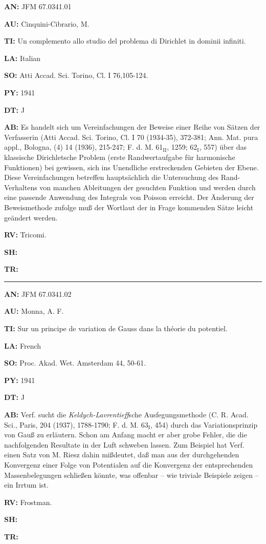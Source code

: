 \item{\bf AN:} JFM 67.0341.01
\item{\bf AU:} Cinquini-Cibrario, M.
\item{\bf TI:} Un complemento allo studio del problema di
Dirichlet in dominii infiniti.
\item{\bf LA:} Italian
\item{\bf SO:} Atti Accad. Sci. Torino, Cl. I 76,105-124.
\item{\bf PY:} 1941
\item{\bf DT:} J
\item{\bf AB:}{\parindent15pt
 Es handelt sich um Vereinfachungen der Beweise einer Reihe von S\"atzen der
Verfasserin (Atti Accad.
Sci. Torino, Cl. I 70 (1934-35), 372-381; Ann. Mat. pura
appl., Bologna, (4) 14
(1936), 215-247; F. d. M. 61$_{\text{II}}$, 1259; 62$_{\text{I}}$, 557) \"uber das klassische
Dirichletsche Problem (erste Randwertaufgabe f\"ur harmonische Funktionen) bei
gewissen, sich ins Unendliche erstreckenden Gebieten der Ebene. Diese
Vereinfachungen betreffen
haupts\"achlich die Untersuchung des Rand-Verhaltens von manchen
Ableitungen der gesuchten Funktion und werden durch eine passende Anwendung
des Integrals von Poisson erreicht. Der \"Anderung der Beweismethode zufolge
mu{\ss}
der Wortlaut der in Frage kommenden S\"atze leicht ge\"andert werden.
}
\item{\bf RV:} Tricomi.
\item{\bf SH:}
\item{\bf TR:}

\bigskip\par\noindent\hrule\bigskip\par

\item{\bf AN:} JFM 67.0341.02
\item{\bf AU:} Monna, A. F.
\item{\bf TI:} Sur un principe de variation de Gauss dans la th\'eorie du potentiel.
\item{\bf LA:} French
\item{\bf SO:} Proc. Akad. Wet. Amsterdam 44, 50-61.
\item{\bf PY:} 1941
\item{\bf DT:} J
\item{\bf AB:}{\parindent15pt
 Verf. sucht die
{\it Keldych-Lavrentieff}sche Ausfegungsmethode (C. R. Acad. Sci.,
Paris, 204 (1937), 1788-1790; F. d. M. 63$_{\text{I}}$, 454) durch das Variationsprinzip von
Gau{\ss} zu erl\"autern. Schon am Anfang macht er aber grobe Fehler, die die
nachfolgenden Resultate
in der Luft schweben lassen. Zum Beispiel hat Verf. einen Satz
von M. Riesz dahin mi{\ss}deutet, da{\ss} man aus der durchgehenden Konvergenz
einer
Folge von Potentialen auf die Konvergenz der entsprechenden Massenbelegungen
schlie{\ss}en k\"onnte,
was offenbar -- wie triviale Beispiele zeigen -- ein Irrtum
ist.
}
\item{\bf RV:} Frostman.
\item{\bf SH:}
\item{\bf TR:}

